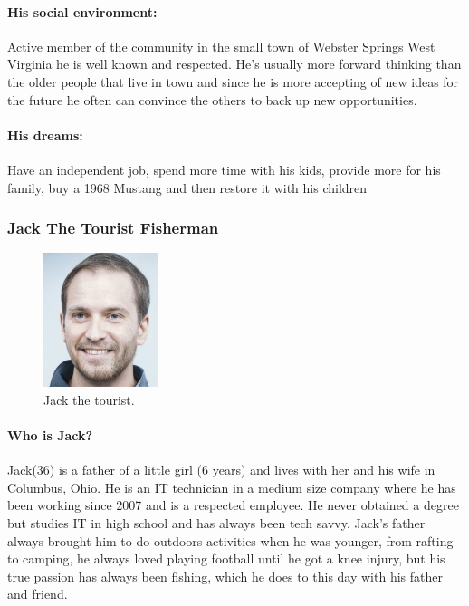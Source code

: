 \paragraph*{His social environment:}
Active member of the community in the small town of Webster Springs West Virginia he is well known and respected. He's usually more forward thinking than the older people that live in town and since he is more accepting of new ideas for the future he often can convince the others to back up new opportunities. 
\paragraph*{His dreams:}
Have an independent job, spend more time with his kids, provide more for his family, buy a 1968 Mustang and then restore it with his children
\clearpage
\subsubsection*{Jack The Tourist Fisherman}
\begin{figure}
\vspace{-\baselineskip}
\centering
\includegraphics[width=0.3\textwidth]{Img/Jack}
\caption{Jack the tourist.}
\vspace{-1.5cm}
\end{figure}
\paragraph*{Who is Jack?}
Jack(36) is a father of a little girl (6 years) and lives with her and his wife in Columbus, Ohio. He is an IT technician in a medium size company where he has been working since 2007 and is a respected employee. He never obtained a degree but studies IT in high school and has always been tech savvy. Jack's father always brought him to do outdoors activities when he was younger, from rafting to camping, he always loved playing football until he got a knee injury, but his true passion has always been fishing, which he does to this day with his father and friend. 
